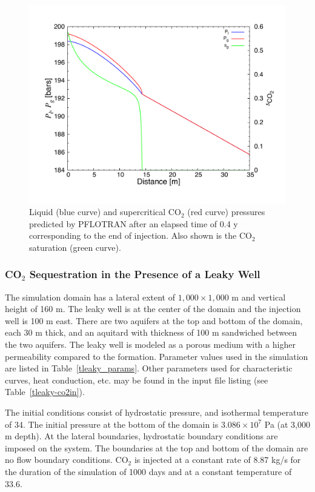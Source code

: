 \begin{figure}[t]\centering
\includegraphics[width=\textwidth]{./figs/p}

\vspace{-1.cm}

\parbox{5in}{
\caption{Liquid (blue curve) and supercritical CO$_2$ (red curve) pressures predicted by PFLOTRAN after an elapsed time of 0.4 y corresponding to the end of injection. Also shown is the CO$_2$ saturation (green curve).}
\label{fp}}
\end{figure}


\clearpage

\subsubsection{CO$_2$ Sequestration in the Presence of a Leaky Well}

The simulation domain has a lateral extent of $1,000\times 1,000$ m and vertical height of 160 m. 
The leaky well is at the center of the domain and the injection well is 100 m east. There are two aquifers at the top and bottom of the domain, each 30 m thick, and an aquitard with thickness of 100 m sandwiched between the two aquifers. 
The leaky well is modeled as a porous medium with a higher permeability compared to the formation. Parameter values used in the simulation are listed in Table~\ref{tleaky_params}. Other parameters used for characteristic curves, heat conduction, etc. may be found in the input file listing (see Table~\ref{tleaky-co2in}).

The initial conditions consist of hydrostatic pressure, and isothermal temperature of 34\degc. The initial pressure at the bottom of the domain is $3.086\times 10^7$ Pa (at 3,000 m depth). 
At the lateral boundaries, hydrostatic boundary conditions are imposed on the system. 
The boundaries at the top and bottom of the domain are no flow boundary conditions. CO$_2$ is injected at a constant rate of 8.87 kg/s for the duration of the simulation of 1000 days and at a constant temperature of 33.6\degc. 

